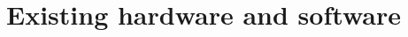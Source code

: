 \documentclass[Main]{subfiles}
\begin{document}
\section{Existing hardware and software}
\end{document}
